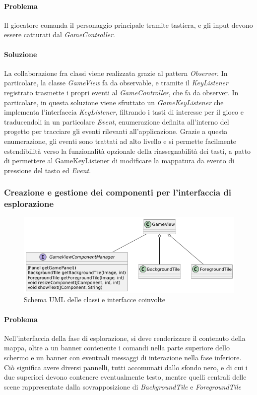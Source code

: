 \documentclass[a4paper,12pt]{report}
\begin{document}
\paragraph{Problema} Il giocatore comanda il personaggio principale tramite tastiera, e gli input devono essere catturati dal \textit{GameController}.
\paragraph{Soluzione} La collaborazione fra classi viene realizzata grazie al pattern \textit{Observer}. In particolare, la classe \textit{GameView} fa da observable, e tramite il \textit{KeyListener} registrato trasmette i propri eventi al \textit{GameController}, che fa da observer. In particolare, in questa soluzione viene sfruttato un \textit{GameKeyListener} che implementa l'interfaccia \textit{KeyListener}, filtrando i tasti di interesse per il gioco e traducendoli in un particolare \textit{Event}, enumerazione definita all'interno del progetto per tracciare gli eventi rilevanti all'applicazione. Grazie a questa enumerazione, gli eventi sono trattati ad alto livello e si permette facilmente estendibilità verso la funzionalità opzionale della riassegnabilità dei tasti, a patto di permettere al GameKeyListener di modificare la mappatura da evento di pressione del tasto ed \textit{Event}.

\subsubsection{Creazione e gestione dei componenti per l'interfaccia di esplorazione}
\begin{figure}[H]
	\centering
	\includegraphics[width=\textwidth]{img/factory-gameview.png}
	\caption{Schema UML delle classi e interfacce coinvolte}
	\label{img:factory-gameview}
\end{figure}
\paragraph{Problema} Nell'interfaccia della fase di esplorazione, si deve renderizzare il contenuto della mappa, oltre a un banner contenente i comandi nella parte superiore dello schermo e un banner con eventuali messaggi di interazione nella fase inferiore. Ciò significa avere diversi pannelli, tutti accomunati dallo sfondo nero, e di cui i due superiori devono contenere eventualmente testo, mentre quelli centrali delle scene rappresentate dalla sovrapposizione di \textit{BackgroundTile} e \textit{ForegroundTile}
\end{document}
